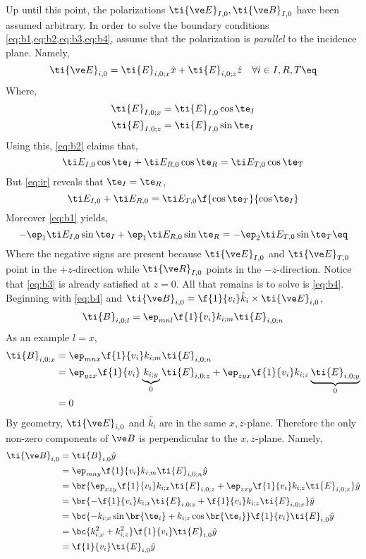 \documentclass{article}
\begin{document}
Up until this point, the polarizations $\ti {\ve E}_{I, 0}, \ti {\ve B}_{I, 0}$ have been assumed arbitrary. In order to solve the boundary conditions \cref{eq:b1,eq:b2,eq:b3,eq:b4}, assume that the polarization is \textit{parallel} to the incidence plane. Namely,
\[ \ti {\ve E}_{i, 0} = \ti {E}_{i, 0; x} \hat x + \ti {E}_{i, 0; z} \hat z \quad \forall i \in I, R, T\eq \label{eq:parallel}\]
Where,
\begin{align*}
    \ti {E}_{I, 0; x} &= \ti {E}_{I, 0} \cos \te_I \\
    \ti {E}_{I, 0; z} &= \ti {E}_{I, 0} \sin \te_I
\end{align*}
Using this, \cref{eq:b2} claims that,
\[ \ti E_{I,0} \cos \te_I + \ti E_{R,0} \cos \te_R = \ti E_{T,0} \cos \te_T\]
But \cref{eq:ir} reveals that $\te_I = \te_R$,
\[ \ti E_{I,0} + \ti E_{R,0}  = \ti E_{T,0} \f{\cos \te_T}{\cos \te_I}\]
Moreover \cref{eq:b1} yields,
\[ -\ep_1\ti E_{I,0} \sin \te_I + \ep_1\ti E_{R,0} \sin \te_R = -\ep_2\ti E_{T,0} \sin \te_T \eq \label{eq:parallel_B1}\]
Where the negative signs are present because $\ti {\ve E}_{I,0}$ and $\ti {\ve E}_{T,0}$ point in the $+z$-direction while $\ti {\ve R}_{I,0}$ points in the $-z$-direction.
Notice that \cref{eq:b3} is already satisfied at $z=0$. All that remains is to solve is \cref{eq:b4}. Beginning with \cref{eq:b4} and $\ti {\ve B}_{i, 0} = \f{1}{v_i} \hat k_{i} \times \ti {\ve E}_{i, 0}$,
\[ \ti {B}_{i, 0;l} = \ep_{mnl} \f{1}{v_i} k_{i;m} \ti {E}_{i, 0;n} \]
As an example $l = x$,
\begin{align*}
\ti {B}_{i, 0;x} &= \ep_{mnx} \f{1}{v_i} k_{i;m} \ti {E}_{i, 0;n} \\
&= \ep_{yzx} \f{1}{v_i} \underbrace{k_{i;y}}_{0} \ti {E}_{i, 0;z} + \ep_{zyx} \f{1}{v_i} k_{i;z} \underbrace{\ti {E}_{i, 0;y}}_{0} \\
&= 0 \\
\end{align*}
By geometry, $\ti {\ve E}_{i, 0}$ and $\hat k_i$ are in the same $x,z$-plane. Therefore the only non-zero components of $\ve B$ is perpendicular to the $x,z$-plane. Namely,
\begin{align*}
\ti {\ve B}_{i, 0}
&= \ti {B}_{i, 0}\hat{y} \\
&= \ep_{mny} \f{1}{v_i} k_{i;m} \ti {E}_{i, 0;n}\hat{y} \\
&= \br{\ep_{xzy} \f{1}{v_i} k_{i;x} \ti {E}_{i, 0;z} + \ep_{zxy} \f{1}{v_i} k_{i;z} \ti {E}_{i, 0;x}}\hat{y} \\
&= \br{- \f{1}{v_i} k_{i;x} \ti {E}_{i, 0;z} + \f{1}{v_i} k_{i;z} \ti {E}_{i, 0;x}}\hat{y} \\
&= \bc{- k_{i;x} \sin\br{\te_i} + k_{i;z} \cos\br{\te_i}}\f{1}{v_i}\ti {E}_{i, 0}\hat{y}\\
&= \bc{k_{i;x}^2 + k_{i;z}^2}\f{1}{v_i}\ti {E}_{i, 0}\hat{y} \\
&= \f{1}{v_i}\ti {E}_{i, 0}\hat{y}
\end{align*}
\end{document}
